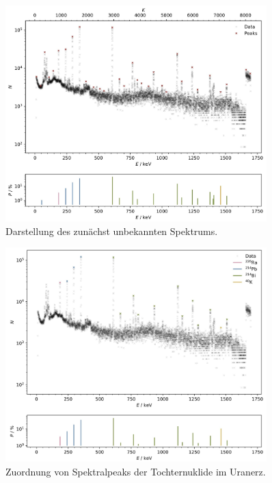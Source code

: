 \cite{iaea_recom}

\begin{figure}[H]
    \centering
    \includegraphics[width=0.9\textwidth]{content/plots/plot11.jpg}
    \caption{Darstellung des zunächst unbekannten Spektrums.}
    \label{fig:plot11}
\end{figure}

\begin{figure}[H]
    \centering
    \includegraphics[width=0.9\textwidth]{content/plots/plot12.jpg}
    \caption{Zuordnung von Spektralpeaks der Tochternuklide im Uranerz.}
    \label{fig:plot12}
\end{figure}
